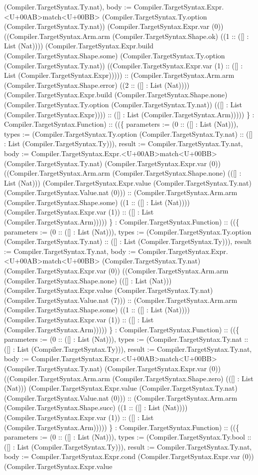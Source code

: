 \documentclass[11pt]{article}
\begin{document}
(Compiler.TargetSyntax.Ty.nat), body := Compiler.TargetSyntax.Expr.<U+00AB>match<U+00BB> (Compiler.TargetSyntax.Ty.option (Compiler.TargetSyntax.Ty.nat)) (Compiler.TargetSyntax.Expr.var (0)) ((Compiler.TargetSyntax.Arm.arm (Compiler.TargetSyntax.Shape.ok) ((1 :: ([] : List (Nat)))) (Compiler.TargetSyntax.Expr.build (Compiler.TargetSyntax.Shape.some) (Compiler.TargetSyntax.Ty.option (Compiler.TargetSyntax.Ty.nat)) ((Compiler.TargetSyntax.Expr.var (1) :: ([] : List (Compiler.TargetSyntax.Expr))))) :: (Compiler.TargetSyntax.Arm.arm (Compiler.TargetSyntax.Shape.error) ((2 :: ([] : List (Nat)))) (Compiler.TargetSyntax.Expr.build (Compiler.TargetSyntax.Shape.none) (Compiler.TargetSyntax.Ty.option (Compiler.TargetSyntax.Ty.nat)) (([] : List (Compiler.TargetSyntax.Expr)))) :: ([] : List (Compiler.TargetSyntax.Arm))))) \} : Compiler.TargetSyntax.Function) :: ((\{ parameters := (0 :: ([] : List (Nat))), types := (Compiler.TargetSyntax.Ty.option (Compiler.TargetSyntax.Ty.nat) :: ([] : List (Compiler.TargetSyntax.Ty))), result := Compiler.TargetSyntax.Ty.nat, body := Compiler.TargetSyntax.Expr.<U+00AB>match<U+00BB> (Compiler.TargetSyntax.Ty.nat) (Compiler.TargetSyntax.Expr.var (0)) ((Compiler.TargetSyntax.Arm.arm (Compiler.TargetSyntax.Shape.none) (([] : List (Nat))) (Compiler.TargetSyntax.Expr.value (Compiler.TargetSyntax.Ty.nat) (Compiler.TargetSyntax.Value.nat (0))) :: (Compiler.TargetSyntax.Arm.arm (Compiler.TargetSyntax.Shape.some) ((1 :: ([] : List (Nat)))) (Compiler.TargetSyntax.Expr.var (1)) :: ([] : List (Compiler.TargetSyntax.Arm))))) \} : Compiler.TargetSyntax.Function) :: ((\{ parameters := (0 :: ([] : List (Nat))), types := (Compiler.TargetSyntax.Ty.option (Compiler.TargetSyntax.Ty.nat) :: ([] : List (Compiler.TargetSyntax.Ty))), result := Compiler.TargetSyntax.Ty.nat, body := Compiler.TargetSyntax.Expr.<U+00AB>match<U+00BB> (Compiler.TargetSyntax.Ty.nat) (Compiler.TargetSyntax.Expr.var (0)) ((Compiler.TargetSyntax.Arm.arm (Compiler.TargetSyntax.Shape.none) (([] : List (Nat))) (Compiler.TargetSyntax.Expr.value (Compiler.TargetSyntax.Ty.nat) (Compiler.TargetSyntax.Value.nat (7))) :: (Compiler.TargetSyntax.Arm.arm (Compiler.TargetSyntax.Shape.some) ((1 :: ([] : List (Nat)))) (Compiler.TargetSyntax.Expr.var (1)) :: ([] : List (Compiler.TargetSyntax.Arm))))) \} : Compiler.TargetSyntax.Function) :: ((\{ parameters := (0 :: ([] : List (Nat))), types := (Compiler.TargetSyntax.Ty.nat :: ([] : List (Compiler.TargetSyntax.Ty))), result := Compiler.TargetSyntax.Ty.nat, body := Compiler.TargetSyntax.Expr.<U+00AB>match<U+00BB> (Compiler.TargetSyntax.Ty.nat) (Compiler.TargetSyntax.Expr.var (0)) ((Compiler.TargetSyntax.Arm.arm (Compiler.TargetSyntax.Shape.zero) (([] : List (Nat))) (Compiler.TargetSyntax.Expr.value (Compiler.TargetSyntax.Ty.nat) (Compiler.TargetSyntax.Value.nat (0))) :: (Compiler.TargetSyntax.Arm.arm (Compiler.TargetSyntax.Shape.succ) ((1 :: ([] : List (Nat)))) (Compiler.TargetSyntax.Expr.var (1)) :: ([] : List (Compiler.TargetSyntax.Arm))))) \} : Compiler.TargetSyntax.Function) :: ((\{ parameters := (0 :: ([] : List (Nat))), types := (Compiler.TargetSyntax.Ty.bool :: ([] : List (Compiler.TargetSyntax.Ty))), result := Compiler.TargetSyntax.Ty.nat, body := Compiler.TargetSyntax.Expr.cond (Compiler.TargetSyntax.Expr.var (0)) (Compiler.TargetSyntax.Expr.value 
\end{document}
